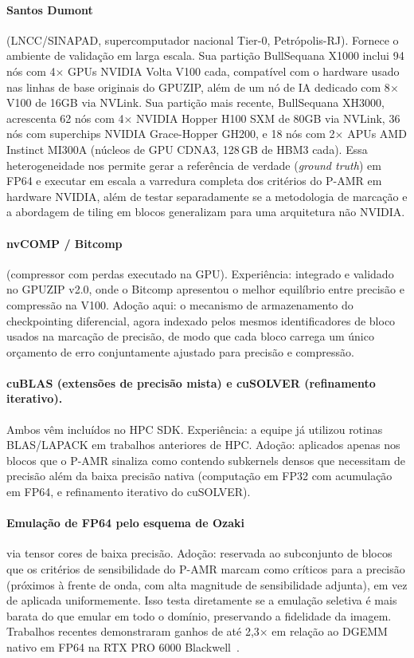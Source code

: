 \documentclass[12pt,a4paper]{article}
\newcommand{\pamr}{P\nobreakdash-AMR}
\begin{document}
\paragraph{Santos Dumont} (LNCC/SINAPAD, supercomputador nacional Tier-0,
Petrópolis-RJ). Fornece o ambiente de validação em larga escala. Sua partição
BullSequana X1000 inclui 94 nós com 4$\times$ GPUs NVIDIA Volta V100 cada,
compatível com o hardware usado nas linhas de base originais do GPUZIP,
além de um nó de IA dedicado com 8$\times$ V100 de 16GB via NVLink. Sua
partição mais recente, BullSequana XH3000, acrescenta 62 nós com 4$\times$
NVIDIA Hopper H100 SXM de 80GB via NVLink, 36 nós com superchips NVIDIA
Grace-Hopper GH200, e 18 nós com 2$\times$ APUs AMD Instinct MI300A (núcleos
de GPU CDNA3, 128\,GB de HBM3 cada). Essa heterogeneidade nos permite gerar a
referência de verdade (\emph{ground truth}) em FP64 e executar em escala a
varredura completa dos critérios do \pamr{} em hardware NVIDIA, além de testar
separadamente se a metodologia de marcação e a abordagem de tiling em blocos
generalizam para uma arquitetura não NVIDIA.

\paragraph{nvCOMP / Bitcomp} (compressor com perdas executado na GPU).
Experiência: integrado e validado no GPUZIP v2.0, onde o Bitcomp apresentou o
melhor equilíbrio entre precisão e compressão na V100. Adoção aqui: o
mecanismo de armazenamento do checkpointing diferencial, agora indexado pelos
mesmos identificadores de bloco usados na marcação de precisão, de modo que
cada bloco carrega um único orçamento de erro conjuntamente ajustado para
precisão e compressão.

\paragraph{cuBLAS (extensões de precisão mista) e cuSOLVER (refinamento
iterativo).} Ambos vêm incluídos no HPC SDK. Experiência: a equipe já utilizou
rotinas BLAS/LAPACK em trabalhos anteriores de HPC. Adoção: aplicados apenas
nos blocos que o \pamr{} sinaliza como contendo subkernels densos que
necessitam de precisão além da baixa precisão nativa (computação em FP32 com
acumulação em FP64, e refinamento iterativo do cuSOLVER).

\paragraph{Emulação de FP64 pelo esquema de Ozaki} via tensor cores de baixa
precisão. Adoção: reservada ao subconjunto de blocos que os critérios de
sensibilidade do \pamr{} marcam como críticos para a precisão (próximos à
frente de onda, com alta magnitude de sensibilidade adjunta), em vez de
aplicada uniformemente. Isso testa diretamente se a emulação seletiva é mais
barata do que emular em todo o domínio, preservando a fidelidade da imagem.
Trabalhos recentes demonstraram ganhos de até 2,3$\times$ em relação ao DGEMM
nativo em FP64 na RTX PRO 6000 Blackwell~\cite{uchino2025ozaki}.
\end{document}
